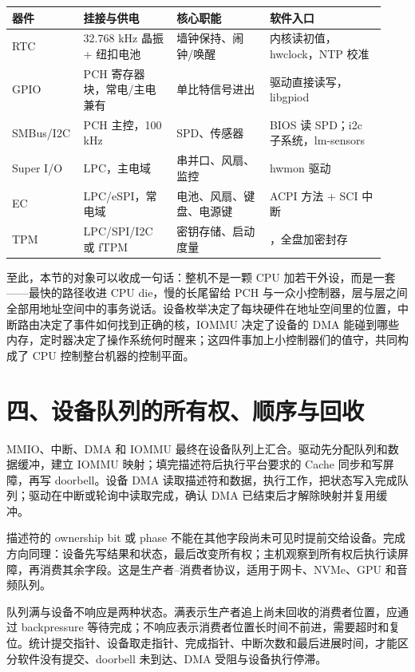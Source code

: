 \begin{longtable}{L{0.15\linewidth}L{0.24\linewidth}L{0.24\linewidth}L{0.30\linewidth}}
\toprule
器件 & 挂接与供电 & 核心职能 & 软件入口 \\
\midrule
RTC & 32.768 kHz 晶振 + 纽扣电池 & 墙钟保持、闹钟/唤醒 & 内核读初值，hwclock，NTP 校准 \\\tablerowrule
GPIO & PCH 寄存器块，常电/主电兼有 & 单比特信号进出 & 驱动直接读写，libgpiod \\\tablerowrule
SMBus/I2C & PCH 主控，100 kHz & SPD、传感器 & BIOS 读 SPD；i2c 子系统，lm-sensors \\\tablerowrule
Super I/O & LPC，主电域 & 串并口、风扇、监控 & hwmon 驱动 \\\tablerowrule
EC & LPC/eSPI，常电域 & 电池、风扇、键盘、电源键 & ACPI 方法 + SCI 中断 \\\tablerowrule
TPM & LPC/SPI/I2C 或 fTPM & 密钥存储、启动度量 & ，全盘加密封存 \\
\bottomrule
\end{longtable}

至此，本节的对象可以收成一句话：整机不是一颗 CPU 加若干外设，而是一套——最快的路径收进 CPU die，慢的长尾留给 PCH 与一众小控制器，层与层之间全部用地址空间中的事务说话。设备枚举决定了每块硬件在地址空间里的位置，中断路由决定了事件如何找到正确的核，IOMMU 决定了设备的 DMA 能碰到哪些内存，定时器决定了操作系统何时醒来；这四件事加上小控制器们的值守，共同构成了 CPU 控制整台机器的控制平面。

\section{四、设备队列的所有权、顺序与回收}

MMIO、中断、DMA 和 IOMMU 最终在设备队列上汇合。驱动先分配队列和数据缓冲，建立 IOMMU 映射；填完描述符后执行平台要求的 Cache 同步和写屏障，再写 doorbell。设备 DMA 读取描述符和数据，执行工作，把状态写入完成队列；驱动在中断或轮询中读取完成，确认 DMA 已结束后才解除映射并复用缓冲。

描述符的 ownership bit 或 phase 不能在其他字段尚未可见时提前交给设备。完成方向同理：设备先写结果和状态，最后改变所有权；主机观察到所有权后执行读屏障，再消费其余字段。这是生产者--消费者协议，适用于网卡、NVMe、GPU 和音频队列。

队列满与设备不响应是两种状态。满表示生产者追上尚未回收的消费者位置，应通过 backpressure 等待完成；不响应表示消费者位置长时间不前进，需要超时和复位。统计提交指针、设备取走指针、完成指针、中断次数和最后进展时间，才能区分软件没有提交、doorbell 未到达、DMA 受阻与设备执行停滞。

